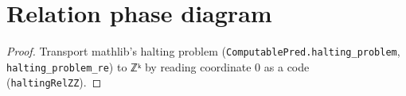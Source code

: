 \section{Relation phase diagram}\label{sec:6}
\begin{proof}
Transport mathlib's halting problem (\texttt{ComputablePred.\allowbreak{}halting\_\allowbreak{}problem}, \texttt{halting\_\allowbreak{}problem\_\allowbreak{}re}) to ℤᵏ by reading coordinate 0 as a code (\texttt{haltingRelZZ}).

\end{proof}


